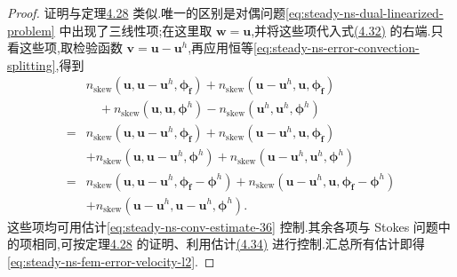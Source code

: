 \begin{proof}
证明与定理\hyperref[thm:stokes-error-velocity-l2]{4.28} 类似.唯一的区别是对偶问题\cref{eq:steady-ns-dual-linearized-problem} 中出现了三线性项;在这里取 $\bm{w}=\bm{u}$,并将这些项代入式\hyperref[eq:stokes-error-velocity-l2-dual-identity]{(4.32)} 的右端.只看这些项,取检验函数 $\bm{v}=\bm{u}-\bm{u}^h$,再应用恒等\cref{eq:steady-ns-error-convection-splitting},得到
\[
\begin{aligned}
 &n_{\mathrm{skew}}(\bm{u},\bm{u}-\bm{u}^h,
                     \symbf{\phi}_{\widehat{\bm{f}}})
  +n_{\mathrm{skew}}(\bm{u}-\bm{u}^h,\bm{u},
                     \symbf{\phi}_{\widehat{\bm{f}}})\\
 &\quad+n_{\mathrm{skew}}(\bm{u},\bm{u},\symbf{\phi}^h)
       -n_{\mathrm{skew}}(\bm{u}^h,\bm{u}^h,\symbf{\phi}^h)\\
  ={}&n_{\mathrm{skew}}(\bm{u},\bm{u}-\bm{u}^h,
                         \symbf{\phi}_{\widehat{\bm{f}}})
      +n_{\mathrm{skew}}(\bm{u}-\bm{u}^h,\bm{u},
                         \symbf{\phi}_{\widehat{\bm{f}}})\\
     &+n_{\mathrm{skew}}(\bm{u},\bm{u}-\bm{u}^h,
                         \symbf{\phi}^h)
      +n_{\mathrm{skew}}(\bm{u}-\bm{u}^h,\bm{u}^h,
                         \symbf{\phi}^h)\\
  ={}&n_{\mathrm{skew}}(\bm{u},\bm{u}-\bm{u}^h,
                         \symbf{\phi}_{\widehat{\bm{f}}}-\symbf{\phi}^h)
      +n_{\mathrm{skew}}(\bm{u}-\bm{u}^h,\bm{u},
                         \symbf{\phi}_{\widehat{\bm{f}}}-\symbf{\phi}^h)\\
     &+n_{\mathrm{skew}}(\bm{u}-\bm{u}^h,
                         \bm{u}-\bm{u}^h,\symbf{\phi}^h).
\end{aligned}
\]
这些项均可用估计\cref{eq:steady-ns-conv-estimate-36} 控制.其余各项与 Stokes 问题中的项相同,可按定理\hyperref[thm:stokes-error-velocity-l2]{4.28} 的证明、利用估计\hyperref[eq:stokes-error-velocity-l2-bound]{(4.34)} 进行控制.汇总所有估计即得\cref{eq:steady-ns-fem-error-velocity-l2}.
\end{proof}

